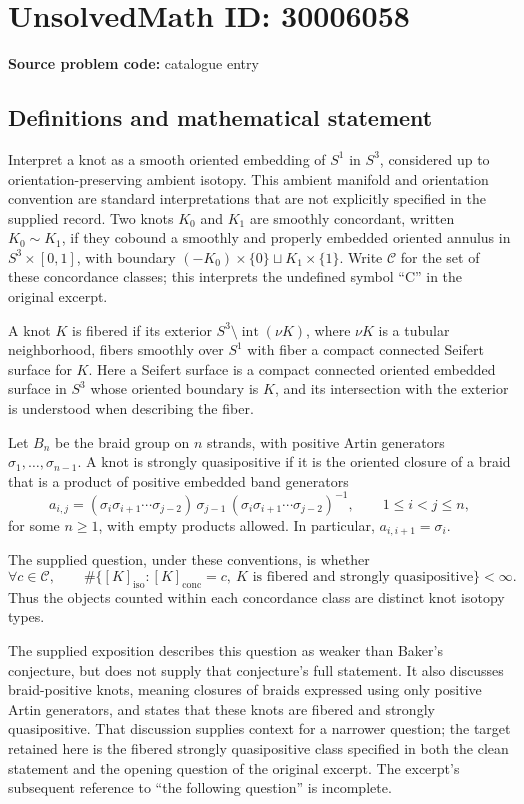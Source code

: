 \documentclass[11pt]{article}
\begin{document}
\section*{UnsolvedMath ID: 30006058}
\textbf{Source problem code:} catalogue entry
\subsection{Definitions and mathematical statement}
Interpret a knot as a smooth oriented embedding of $S^1$ in $S^3$, considered up to orientation-preserving ambient isotopy. This ambient manifold and orientation convention are standard interpretations that are not explicitly specified in the supplied record. Two knots $K_0$ and $K_1$ are smoothly concordant, written $K_0\sim K_1$, if they cobound a smoothly and properly embedded oriented annulus in $S^3\times[0,1]$, with boundary $(-K_0)\times\{0\}\sqcup K_1\times\{1\}$. Write $\mathcal C$ for the set of these concordance classes; this interprets the undefined symbol ``C'' in the original excerpt.

A knot $K$ is fibered if its exterior $S^3\setminus\operatorname{int}(\nu K)$, where $\nu K$ is a tubular neighborhood, fibers smoothly over $S^1$ with fiber a compact connected Seifert surface for $K$. Here a Seifert surface is a compact connected oriented embedded surface in $S^3$ whose oriented boundary is $K$, and its intersection with the exterior is understood when describing the fiber.

Let $B_n$ be the braid group on $n$ strands, with positive Artin generators $\sigma_1,\ldots,\sigma_{n-1}$. A knot is strongly quasipositive if it is the oriented closure of a braid that is a product of positive embedded band generators
\[
 a_{i,j}=(\sigma_i\sigma_{i+1}\cdots\sigma_{j-2})\,\sigma_{j-1}\,(\sigma_i\sigma_{i+1}\cdots\sigma_{j-2})^{-1},\qquad 1\leq i<j\leq n,
\]
for some $n\geq1$, with empty products allowed. In particular, $a_{i,i+1}=\sigma_i$.

The supplied question, under these conventions, is whether
\[
 \forall c\in\mathcal C,\qquad
 \#\bigl\{[K]_{\mathrm{iso}}: [K]_{\mathrm{conc}}=c,\ K\text{ is fibered and strongly quasipositive}\bigr\}<\infty.
\]
Thus the objects counted within each concordance class are distinct knot isotopy types.

The supplied exposition describes this question as weaker than Baker's conjecture, but does not supply that conjecture's full statement. It also discusses braid-positive knots, meaning closures of braids expressed using only positive Artin generators, and states that these knots are fibered and strongly quasipositive. That discussion supplies context for a narrower question; the target retained here is the fibered strongly quasipositive class specified in both the clean statement and the opening question of the original excerpt. The excerpt's subsequent reference to ``the following question'' is incomplete.
\end{document}
